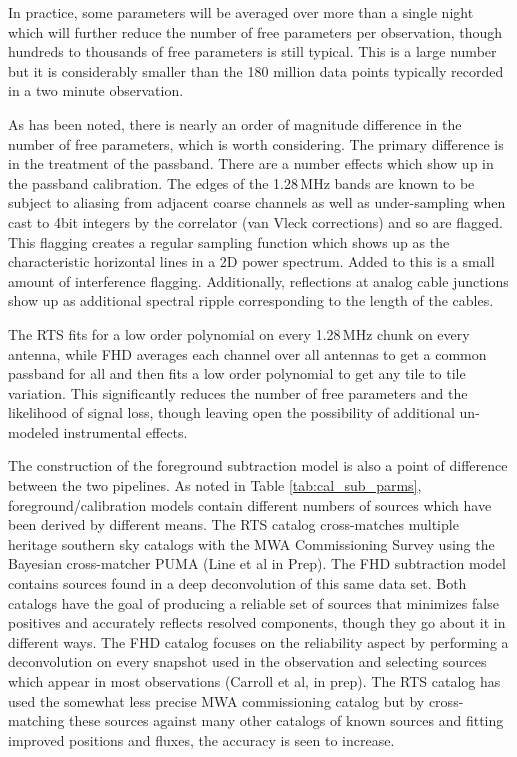 \documentclass[twolcolumn,iop]{emulateapj}
\begin{document}
In practice, some parameters will be averaged over more than a single night which will further reduce the number of free parameters per observation, though hundreds to thousands of free parameters is still typical. This is a large number but it is considerably smaller than the 180 million data points typically recorded in a two minute observation. 

As has been noted, there is nearly an order of magnitude difference in the number of free parameters, which is worth considering. The primary difference is in the treatment of the passband.  There are a number effects which show up in the passband calibration. The edges of the 1.28\,MHz bands are known to be subject to aliasing from adjacent coarse channels as well as under-sampling when cast to 4bit integers by the correlator (van Vleck corrections) and so are flagged. This flagging creates a regular sampling function which shows up as the characteristic horizontal lines in a 2D power spectrum. Added to this is a small amount of interference flagging.  Additionally, reflections at analog cable junctions show up as additional spectral ripple corresponding to the length of the cables.    

The RTS fits for a low order polynomial on every 1.28\,MHz chunk on every antenna, while FHD averages each channel over all antennas to get a common passband for all and then fits a low order polynomial to get any tile to tile variation. This significantly reduces the number of free parameters and the likelihood of signal loss, though leaving open the possibility of additional un-modeled instrumental effects.

The construction of the foreground subtraction model is also a point of difference between the two pipelines.
As noted in Table \ref{tab:cal_sub_parms}, foreground/calibration models contain different numbers of sources which have been derived by different means. The RTS catalog cross-matches multiple heritage southern sky catalogs with the MWA Commissioning Survey using the Bayesian cross-matcher PUMA (Line et al in Prep).  The FHD subtraction model contains sources found in a deep deconvolution of this same data set. Both catalogs have the goal of producing a reliable set of sources that minimizes false positives and accurately reflects resolved components, though they go about it in different ways. The FHD catalog focuses on the reliability aspect by performing a deconvolution on every snapshot used in the observation and selecting sources which appear in most observations (Carroll et al, in prep). The RTS catalog has used the somewhat less precise MWA commissioning catalog but by cross-matching these sources against many other catalogs of known sources and fitting improved positions and fluxes, the accuracy is seen to increase.
\end{document}
